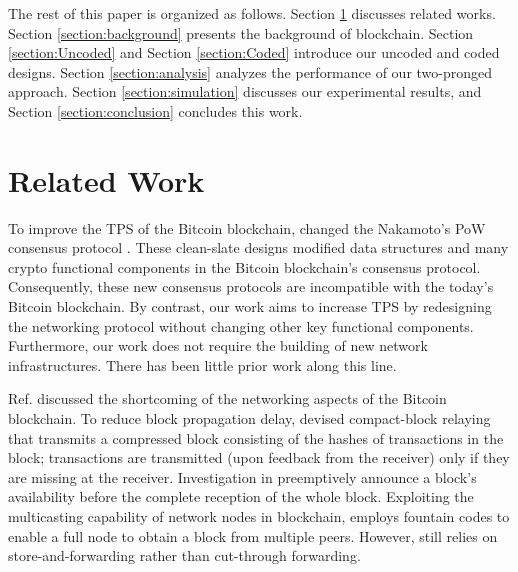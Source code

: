 \documentclass[10pt,journal,compsoc]{IEEEtran}
\begin{document}
The rest of this paper is organized as follows. Section \ref{section:relatedWork} discusses related works. Section \ref{section:background} presents the background of blockchain. Section \ref{section:Uncoded} and Section \ref{section:Coded} introduce our uncoded and coded designs. Section \ref{section:analysis} analyzes the performance of our two-pronged approach. Section \ref{section:simulation} discusses our experimental results, and Section \ref{section:conclusion} concludes this work.

\section{Related Work}\label{section:relatedWork}
To improve the TPS of the Bitcoin blockchain, \cite{consensus2019, natoli2019deconstructing} changed the Nakamoto's PoW consensus protocol . These clean-slate designs modified data structures and many crypto functional components in the Bitcoin blockchain’s consensus protocol. Consequently, these new consensus protocols are incompatible with the today’s Bitcoin blockchain. By contrast, our work aims to increase TPS by redesigning the networking protocol without changing other key functional components. Furthermore, our work does not require the building of new network infrastructures. There has been little prior work along this line. 

Ref. \cite{mccorry2020sok} discussed the shortcoming of the networking aspects of the Bitcoin blockchain. To reduce block propagation delay, \cite{corallo2017compact, ozisik2017graphene} devised compact-block relaying that transmits a compressed block consisting of the hashes of transactions in the block; transactions are transmitted (upon feedback from the receiver) only if they are missing at the receiver. Investigation in \cite{decker2013information} preemptively announce a block's availability before the complete reception of the whole block. Exploiting the multicasting capability of network nodes in blockchain, \cite{chawla2019velocity} employs fountain codes \cite{luby2002lt} to enable a full node to obtain a block from multiple peers. However, \cite{chawla2019velocity} still relies on store-and-forwarding rather than cut-through forwarding. 
\end{document}

